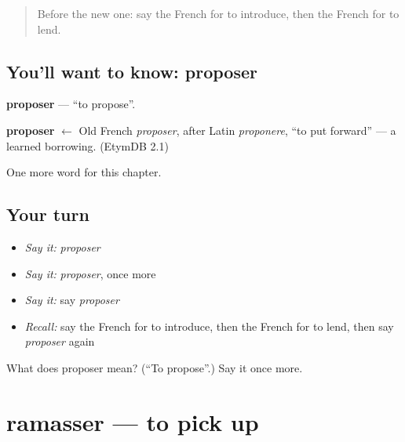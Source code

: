 \label{lesson:FR-C180-proposer}



\begin{quote}
Before the new one: say the French for to introduce, then the French for to lend.
\end{quote}

\subsection*{You'll want to know: proposer}
\textbf{proposer} — \textquotedblleft{}to propose\textquotedblright{}.

\begin{cousinweb}
\textbf{proposer} $\leftarrow$ Old French \emph{proposer}, after Latin \emph{proponere}, \textquotedblleft{}to put forward\textquotedblright{} — a learned borrowing. (EtymDB 2.1)
\end{cousinweb}

\begin{grammarlens}[title={What you've built}]
One more word for this chapter.
\end{grammarlens}

\subsection*{Your turn}
\begin{itemize}
\raggedright
  \item \emph{Say it:} \emph{proposer}
  \item \emph{Say it:} \emph{proposer}, once more
  \item \emph{Say it:} say \emph{proposer}
  \item \emph{Recall:} say the French for to introduce, then the French for to lend, then say \emph{proposer} again
\end{itemize}

\begin{tcolorbox}[breakable,colback=teal!4,colframe=teal!35!black,title={Before you move on}]
What does proposer mean? (\textquotedblleft{}To propose\textquotedblright{}.) Say it once more.
\end{tcolorbox}
\section[ramasser]{ramasser — to pick up}

\label{lesson:FR-C180-ramasser}



